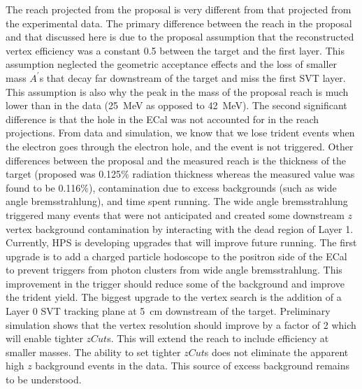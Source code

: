 The reach projected from the proposal is very different from that projected from the experimental data. The primary difference between the reach in the proposal and that discussed here is due to the proposal assumption that the reconstructed vertex efficiency was a constant 0.5 between the target and the first layer. This assumption neglected the geometric acceptance effects and the loss of smaller mass $A^{\prime}$s that decay far downstream of the target and miss the first SVT layer. This assumption is also why the peak in the mass of the proposal reach is much lower than in the data (25~MeV as opposed to 42~MeV). The second significant difference is that the hole in the ECal was not accounted for in the reach projections. From data and simulation, we know that we lose trident events when the electron goes through the electron hole, and the event is not triggered. Other differences between the proposal and the measured reach is the thickness of the target (proposed was 0.125$\%$ radiation thickness whereas the measured value was found to be 0.116$\%$), contamination due to excess backgrounds (such as wide angle bremsstrahlung), and time spent running. The wide angle bremsstrahlung triggered many events that were not anticipated and created some downstream $z$ vertex background contamination by interacting with the dead region of Layer 1. \\
\indent Currently, HPS is developing upgrades that will improve future running. The first upgrade is to add a charged particle hodoscope to the positron side of the ECal to prevent triggers from photon clusters from wide angle bremsstrahlung. This improvement in the trigger should reduce some of the background and improve the trident yield. The biggest upgrade to the vertex search is the addition of a Layer 0 SVT tracking plane at 5~cm downstream of the target. Preliminary simulation shows that the vertex resolution should improve by a factor of 2 which will enable tighter $zCut$s. This will extend the reach to include efficiency at smaller masses. The ability to set tighter $zCut$s does not eliminate the apparent high $z$ background events in the data. This source of excess background remains to be understood.

